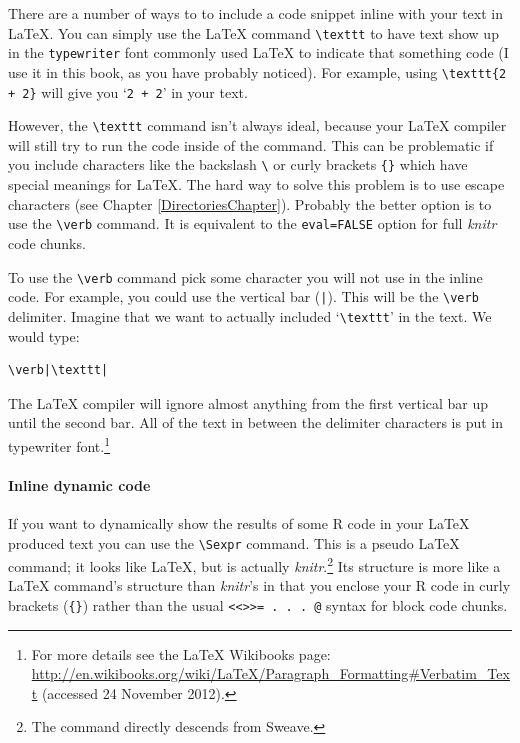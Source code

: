 There are a number of ways to to include a code snippet inline with your text in LaTeX. You can simply use the LaTeX command \verb|\texttt| to have text show up in the \texttt{typewriter} font commonly used LaTeX to indicate that something code (I use it in this book, as you have probably noticed). For example, using \verb|\texttt{2 + 2}| will give you `\texttt{2 + 2}' in your text.

However, the \verb|\texttt| command isn't always ideal, because your LaTeX compiler will still try to run the code inside of the command. This can be problematic if you include characters like the backslash \verb|\| or curly brackets \verb|{}| which have special meanings for LaTeX. The hard way to solve this problem is to use escape characters (see Chapter \ref{DirectoriesChapter}). Probably the better option is to use the \verb|\verb| command. It is equivalent to the \texttt{eval=FALSE} option for full {\emph{knitr}} code chunks. 

To use the \verb|\verb| command pick some character you will not use in the inline code. For example, you could use the vertical bar (\texttt{|}). This will be the \verb|\verb| delimiter. Imagine that we want to actually included `\verb|\texttt|' in the text. We would type:

\begin{knitrout}
    \color{fgcolor}
    \begin{kframe}
        \begin{verbatim}
\verb|\texttt|
            \end{verbatim}
        \end{kframe}
\end{knitrout}

\noindent The LaTeX compiler will ignore almost anything from the first vertical bar up until the second bar. All of the text in between the delimiter characters is put in typewriter font.\footnote{For more details see the LaTeX Wikibooks page: \url{http://en.wikibooks.org/wiki/LaTeX/Paragraph_Formatting#Verbatim_Text} (accessed 24 November 2012).}

\paragraph{Inline dynamic code}

If you want to dynamically show the results of some R code in your LaTeX produced text you can use the  \texttt{\textbackslash Sexpr} command. This is a pseudo LaTeX command; it looks like LaTeX, but is actually {\emph{knitr}}.\footnote{The command directly descends from Sweave.} Its structure is more like a LaTeX command's structure than {\emph{knitr}}'s in that you enclose your R code in curly brackets (\texttt{\{\}}) rather than the usual \verb|<<>>= . . . @| syntax for block code chunks. 

